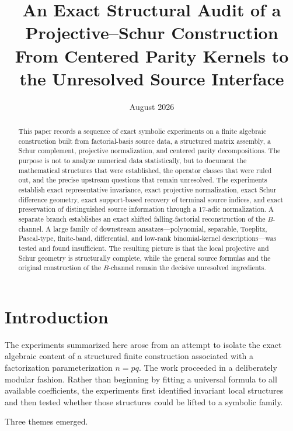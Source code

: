\documentclass[11pt]{article}
\title{An Exact Structural Audit of a Projective--Schur Construction\\
\large From Centered Parity Kernels to the Unresolved Source Interface}
\author{}
\date{August 2026}
\begin{document}
\maketitle

\begin{abstract}
This paper records a sequence of exact symbolic experiments on a finite algebraic construction built from factorial-basis source data, a structured matrix assembly, a Schur complement, projective normalization, and centered parity decompositions. The purpose is not to analyze numerical data statistically, but to document the mathematical structures that were established, the operator classes that were ruled out, and the precise upstream questions that remain unresolved. The experiments establish exact representative invariance, exact projective normalization, exact Schur difference geometry, exact support-based recovery of terminal source indices, and exact preservation of distinguished source information through a $17$-adic normalization. A separate branch establishes an exact shifted falling-factorial reconstruction of the $B$-channel. A large family of downstream ansatzes---polynomial, separable, Toeplitz, Pascal-type, finite-band, differential, and low-rank binomial-kernel descriptions---was tested and found insufficient. The resulting picture is that the local projective and Schur geometry is structurally complete, while the general source formulas and the original construction of the $B$-channel remain the decisive unresolved ingredients.
\end{abstract}

\section{Introduction}

The experiments summarized here arose from an attempt to isolate the exact algebraic content of a structured finite construction associated with a factorization parameterization $n=pq$. The work proceeded in a deliberately modular fashion. Rather than beginning by fitting a universal formula to all available coefficients, the experiments first identified invariant local structures and then tested whether those structures could be lifted to a symbolic family.

Three themes emerged.
\end{document}
